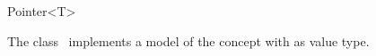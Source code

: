 

\begin{ccRefClass}{Pointer<T>}  %


\ccDefinition
  
The class \ccRefName\ implements  a model of the concept 
with  as value type.


\ccIsModel
{}

\ccTypes
{}







\end{ccRefClass}


